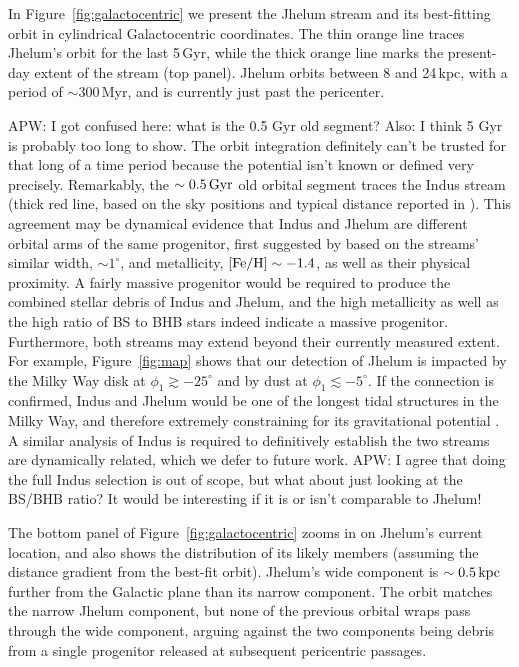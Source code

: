 \documentclass[twocolumn]{aastex62}
\newcommand{\apw}[1]{{\color{blue} APW: #1}}
\begin{document}
In Figure~\ref{fig:galactocentric} we present the Jhelum stream and its best-fitting orbit in cylindrical Galactocentric coordinates.
The thin orange line traces Jhelum's orbit for the last 5\,Gyr, while the thick orange line marks the present-day extent of the stream (top panel).
Jhelum orbits between 8 and 24\,kpc, with a period of $\sim300$\,Myr, and is currently just past the pericenter.

\apw{I got confused here: what is the 0.5 Gyr old segment? Also: I think 5 Gyr is probably too long to show. The orbit integration definitely can't be trusted for that long of a time period because the potential isn't known or defined very precisely.}
Remarkably, the $\sim0.5\,\rm{Gyr}$ old orbital segment traces the Indus stream (thick red line, based on the sky positions and typical distance reported in \citealt{shipp2018}).
This agreement may be dynamical evidence that Indus and Jhelum are different orbital arms of the same progenitor, first suggested by \citet{shipp2018} based on the streams' similar width, $\sim1^\circ$, and metallicity, $\rm[Fe/H]\sim-1.4$, as well as their physical proximity.
A fairly massive progenitor would be required to produce the combined stellar debris of Indus and Jhelum, and the high metallicity as well as the high ratio of BS to BHB stars indeed indicate a massive progenitor.
Furthermore, both streams may extend beyond their currently measured extent.
For example, Figure~\ref{fig:map} shows that our detection of Jhelum is impacted by the Milky Way disk at $\phi_1\gtrsim-25^\circ$ and by dust at $\phi_1\lesssim-5^\circ$.
If the connection is confirmed, Indus and Jhelum would be one of the longest tidal structures in the Milky Way, and therefore extremely constraining for its gravitational potential \citep{bh2018}.
A similar analysis of Indus is required to definitively establish the two streams are dynamically related, which we defer to future work.
\apw{I agree that doing the full Indus selection is out of scope, but what about just looking at the BS/BHB ratio? It would be interesting if it is or isn't comparable to Jhelum!}

The bottom panel of Figure~\ref{fig:galactocentric} zooms in on Jhelum's current location, and also shows the distribution of its likely members (assuming the distance gradient from the best-fit orbit).
Jhelum's wide component is $\sim0.5\,\rm kpc$ further from the Galactic plane than its narrow component.
The orbit matches the narrow Jhelum component, but none of the previous orbital wraps pass through the wide component, arguing against the two components being debris from a single progenitor released at subsequent pericentric passages.
\end{document}
